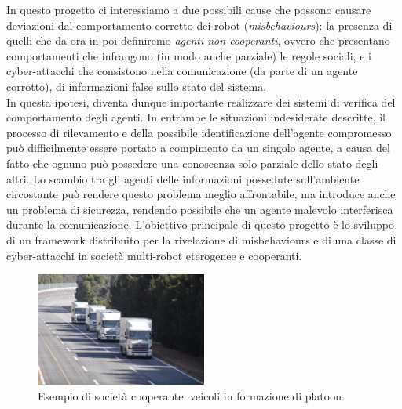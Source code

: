 \documentclass[paper=a4, fontsize=11pt]{scrartcl} %
\numberwithin{equation}{section} %
\numberwithin{table}{section} %
\begin{document}
In questo progetto ci interessiamo a due possibili cause che possono causare
deviazioni dal comportamento corretto dei robot (\textit{misbehaviours}): la presenza di quelli che 
da ora in poi definiremo \textit{agenti non cooperanti}, ovvero che presentano comportamenti che infrangono (in modo anche parziale) le regole sociali, e
i cyber-attacchi che consistono nella comunicazione (da parte di un agente corrotto), di informazioni false sullo stato del sistema. \\

In questa ipotesi, diventa dunque importante realizzare dei
sistemi di verifica del comportamento degli agenti. In entrambe le situazioni indesiderate descritte, il processo di rilevamento e della possibile identificazione dell'agente compromesso può difficilmente essere portato a compimento da un singolo agente, a causa del fatto che ognuno può possedere una conoscenza solo parziale dello stato degli altri.
Lo scambio tra gli agenti delle informazioni possedute sull'ambiente circostante può rendere questo problema meglio affrontabile, ma introduce
anche un problema di sicurezza, rendendo possibile che un agente malevolo 
interferisca durante la comunicazione. L'obiettivo principale di questo progetto è 
lo sviluppo di un framework distribuito per la rivelazione di misbehaviours
e di una classe di cyber-attacchi in società multi-robot eterogenee e cooperanti.

\begin{figure}[ht]
\centering
\includegraphics[width=0.5\textwidth]{platoon}
\caption{Esempio di società cooperante: veicoli in formazione di platoon.}
\label{img:platoon}
\end{figure}



\end{document}

